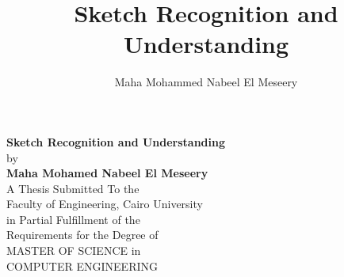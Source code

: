 \documentclass[11pt,doublespace]{Sketchthesis}
\begin{document}
\title{Sketch Recognition and Understanding}             %
\author{Maha Mohammed Nabeel El Meseery}                               %
\degreemonth{}                                      %
\degreeyear{}                                      %

\maketitle

\thispagestyle{empty}               %
\newpage                                                             
\begin{center}     
\LARGE  
\textbf{Sketch Recognition and Understanding}\\
\normalsize by      \\ 
\Large  \textbf{ Maha Mohamed Nabeel El Meseery}\\
\vspace*{0.4in}        
\normalsize
A Thesis Submitted To the\\
Faculty of Engineering, Cairo University\\
in Partial Fulfillment of the\\
Requirements for the Degree of\\
MASTER OF SCIENCE
in\\
COMPUTER ENGINEERING\\

\end{center}
          
\end{document}
